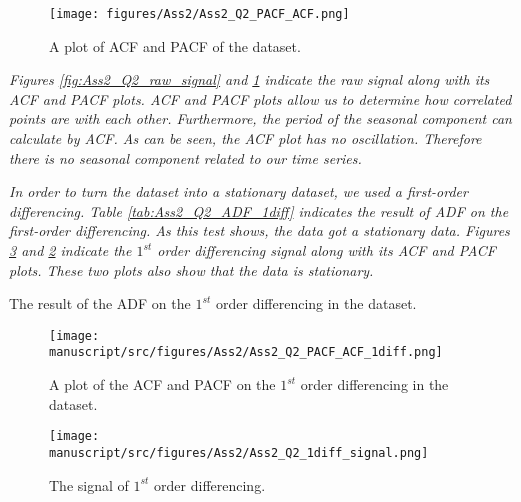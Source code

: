 \begin{figure}[H]
    \centering
    \begin{minipage}[b]{1\textwidth}
        \texttt{[image: figures/Ass2/Ass2\_Q2\_PACF\_ACF.png]}
    \end{minipage}
    \caption{A plot of \gls{ACF} and \gls{PACF} of the dataset.}
    \label{fig:Ass2_Q2_PACF_ACF}
\end{figure}


\textit{Figures \ref{fig:Ass2_Q2_raw_signal} and \ref{fig:Ass2_Q2_PACF_ACF} indicate the raw signal along with its \gls{ACF} and \gls{PACF} plots. \gls{ACF} and \gls{PACF} plots allow us to determine how correlated points are with each other. Furthermore, the period of the seasonal component can calculate by \gls{ACF}. As can be seen, the \gls{ACF} plot has no oscillation. Therefore there is no seasonal component related to our time series.}




\textit{In order to turn the dataset into a stationary dataset, we used a first-order differencing. Table \ref{tab:Ass2_Q2_ADF_1diff} indicates the result of \gls{ADF}  on the first-order differencing. As this test shows, the data got a stationary data. Figures \ref{fig:Ass2_Q2_1diff_signal} and \ref{fig:Ass2_Q2_PACF_ACF_1diff} indicate the $1^{st}$ order differencing signal along with its \gls{ACF} and \gls{PACF} plots. These two plots also show that the data is stationary. }

\begin{table}[H]
\centering
\caption{The result of the \gls{ADF} on the $1^{st}$ order differencing in the dataset.}
\label{tab:Ass2_Q2_ADF_1diff}

\end{table}

\begin{figure}[H]
    \centering
    \begin{minipage}[b]{1\textwidth}
        \texttt{[image: manuscript/src/figures/Ass2/Ass2\_Q2\_PACF\_ACF\_1diff.png]}
    \end{minipage}
    \caption{ A plot of the \gls{ACF} and \gls{PACF} on the $1^{st}$ order differencing in the dataset.}
    \label{fig:Ass2_Q2_PACF_ACF_1diff}
\end{figure}
\begin{figure}[H]
    \centering
    \begin{minipage}[b]{1\textwidth}
        \texttt{[image: manuscript/src/figures/Ass2/Ass2\_Q2\_1diff\_signal.png]}
    \end{minipage}
    \caption{ The signal of $1^{st}$ order differencing.}
    \label{fig:Ass2_Q2_1diff_signal}
\end{figure}



